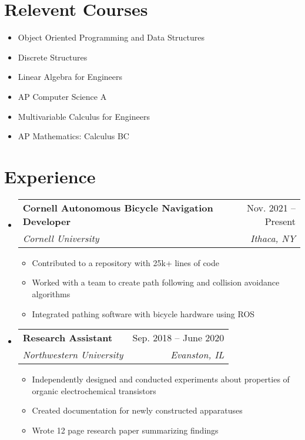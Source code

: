 \documentclass[letterpaper,11pt]{article}
\makeatletter
\newcommand{\resumeItem}[1]{
  \item\small{
    {#1 \vspace{-2pt}}
  }
}
\newcommand{\resumeSubheading}[4]{
  \vspace{-2pt}\item
    \begin{tabular*}{0.97\textwidth}[t]{l@{\extracolsep{\fill}}r}
      \textbf{#1} & #2 \\
      \textit{\small#3} & \textit{\small #4} \\
    \end{tabular*}\vspace{-7pt}
}
\newcommand{\resumeSubHeadingListStart}{\begin{itemize}[leftmargin=0.15in, label={}]}
\newcommand{\resumeSubHeadingListEnd}{\end{itemize}}
\newcommand{\resumeItemListStart}{\begin{itemize}}
\newcommand{\resumeItemListEnd}{\end{itemize}\vspace{-5pt}}
\makeatother
\begin{document}
\section{Relevent Courses}
  \begin{multicols}{2}\small
    \begin{itemize}
      \item Object Oriented Programming and Data Structures
      \item Discrete Structures
      \item Linear Algebra for Engineers
      \item AP Computer Science A
      \item Multivariable Calculus for Engineers
      \item AP Mathematics: Calculus BC
    \end{itemize}\normalsize
  \end{multicols}
  


\section{Experience}
  \resumeSubHeadingListStart

    \resumeSubheading
      {Cornell Autonomous Bicycle Navigation Developer}{Nov. 2021 -- Present}
      {Cornell University}{Ithaca, NY}
      \resumeItemListStart
        \resumeItem{Contributed to a repository with 25k+ lines of code}
        \resumeItem{Worked with a team to create path following and collision avoidance algorithms}
        \resumeItem{Integrated pathing software with bicycle hardware using ROS}
      \resumeItemListEnd

    \resumeSubheading
      {Research Assistant}{Sep. 2018 -- June 2020}
      {Northwestern University}{Evanston, IL}
      \resumeItemListStart
        \resumeItem{Independently designed and conducted experiments about properties of organic electrochemical transistors}
        \resumeItem{Created documentation for newly constructed apparatuses}
        \resumeItem{Wrote 12 page research paper summarizing findings}
    \resumeItemListEnd

  \resumeSubHeadingListEnd


\end{document}
